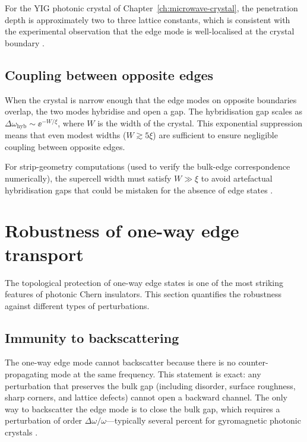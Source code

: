 For the YIG photonic crystal of Chapter~\ref{ch:microwave-crystal},
the penetration depth is approximately two to three lattice constants,
which is consistent with the experimental observation that the
edge mode is well-localised at the crystal boundary
\cite{nature2026observation,ma2017scattering}.

\subsection{Coupling between opposite edges}
\label{sec:ch8-opposite-edge}

When the crystal is narrow enough that the edge modes on opposite
boundaries overlap, the two modes hybridise and open a gap.  The
hybridisation gap scales as $\Delta\omega_{\mathrm{hyb}} \sim
\ee^{-W/\xi}$, where $W$ is the width of the crystal.  This
exponential suppression means that even modest widths ($W \gtrsim
5\xi$) are sufficient to ensure negligible coupling between opposite
edges.

For strip-geometry computations (used to verify the bulk-edge
correspondence numerically), the supercell width must satisfy
$W \gg \xi$ to avoid artefactual hybridisation gaps that could be
mistaken for the absence of edge states
\cite{ozawa2018topological,paz2019tutorial}.

\section{Robustness of one-way edge transport}
\label{sec:ch8-edge-transport-robustness}

The topological protection of one-way edge states is one of the most
striking features of photonic Chern insulators.  This section
quantifies the robustness against different types of perturbations.

\subsection{Immunity to backscattering}
\label{sec:ch8-backscattering}

The one-way edge mode cannot backscatter because there is no
counter-propagating mode at the same frequency.  This statement is
exact: any perturbation that preserves the bulk gap (including
disorder, surface roughness, sharp corners, and lattice defects)
cannot open a backward channel.  The only way to backscatter
the edge mode is to close the bulk gap, which requires a
perturbation of order $\Delta\omega/\omega$---typically several
percent for gyromagnetic photonic crystals
\cite{nature2026observation,skirlo2015experimental}.

